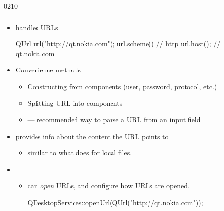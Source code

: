 \begin{slide}[fragile]{0210}\frametitle{}
\begin{itemize}
\item {} handles URLs
\begin{cpp}
QUrl url("http://qt.nokia.com");
url.scheme()  // http
url.host();   // qt.nokia.com
\end{cpp}

\item Convenience methods 
\begin{itemize}
  \item Constructing from components (user, password, protocol, etc.)
  \item Splitting URL into components
  \item {} --- recommended way to parse a URL from an input field
\end{itemize}
\item {} provides info about the content the URL points to
  \begin{itemize}
  	\item similar to what  does for local files.
  \end{itemize}  
  \item {}
  \begin{itemize}  
  	\item can \emph{open} URLs, and configure how URLs are opened.
  	\begin{cpp}
QDesktopServices::openUrl(QUrl("http://qt.nokia.com"));
  	\end{cpp}
  \end{itemize}  
\end{itemize}
\end{slide}

